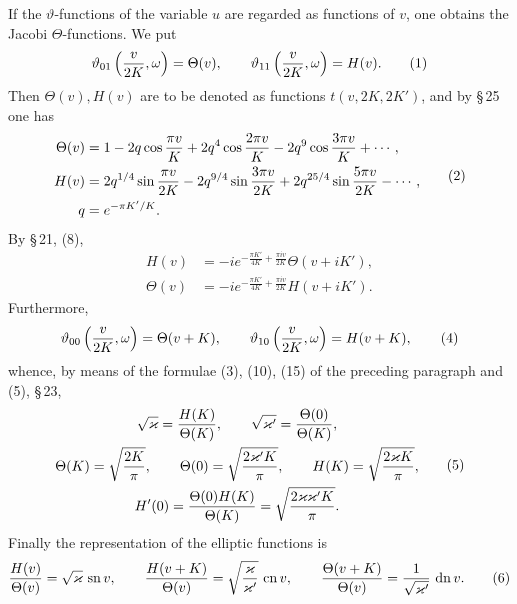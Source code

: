 \documentclass[11pt]{article}
\providecommand{\tht}{\vartheta}
\providecommand{\sn}{\operatorname{sn}}
\providecommand{\cn}{\operatorname{cn}}
\providecommand{\dn}{\operatorname{dn}}
\begin{document}
If the $\vartheta$-functions of the variable $u$ are regarded as functions of $v$, one obtains the Jacobi $\Theta$-functions. We put
\begin{equation}
\tht_{01}\left({v\over2K},\omega\right)=\Theta(v),
\qquad
\tht_{11}\left({v\over2K},\omega\right)=H(v).
\tag{1}
\end{equation}
Then $\Theta(v),H(v)$ are to be denoted as functions $t(v,2K,2K')$, and by \S\,25 one has
\begin{equation}
\begin{aligned}
\Theta(v)&=1-2q\cos{\pi v\over K}+2q^4\cos{2\pi v\over K}-2q^9\cos{3\pi v\over K}+\cdots,\\
H(v)&=2q^{1/4}\sin{\pi v\over2K}-2q^{9/4}\sin{3\pi v\over2K}+2q^{25/4}\sin{5\pi v\over2K}-\cdots,\\
q&=e^{-\pi K'/K}.
\end{aligned}
\tag{2}
\end{equation}
By \S\,21, (8),
\begin{equation}
\begin{aligned}
H(v)&=-i e^{-\frac{\pi K'}{4K}+\frac{\pi i v}{2K}}\Theta(v+iK'),\\
\Theta(v)&=-i e^{-\frac{\pi K'}{4K}+\frac{\pi i v}{2K}}H(v+iK').
\end{aligned}
\tag{3}
\end{equation}
Furthermore,
\begin{equation}
\tht_{00}\left({v\over2K},\omega\right)=\Theta(v+K),
\qquad
\tht_{10}\left({v\over2K},\omega\right)=H(v+K),
\tag{4}
\end{equation}
whence, by means of the formulae (3), (10), (15) of the preceding paragraph and (5), \S\,23,
\begin{equation}
\begin{gathered}
\sqrt\varkappa={H(K)\over\Theta(K)},
\qquad
\sqrt{\varkappa'}={\Theta(0)\over\Theta(K)},\\
\Theta(K)=\sqrt{2K\over\pi},
\qquad
\Theta(0)=\sqrt{2\varkappa'K\over\pi},
\qquad
H(K)=\sqrt{2\varkappa K\over\pi},\\
H'(0)={\Theta(0)H(K)\over\Theta(K)}=\sqrt{2\varkappa\varkappa'K\over\pi}.
\end{gathered}
\tag{5}
\end{equation}
Finally the representation of the elliptic functions is
\begin{equation}
{H(v)\over\Theta(v)}=\sqrt\varkappa\,\sn v,
\qquad
{H(v+K)\over\Theta(v)}=\sqrt{\varkappa\over\varkappa'}\,\cn v,
\qquad
{\Theta(v+K)\over\Theta(v)}={1\over\sqrt{\varkappa'}}\,\dn v.
\tag{6}
\end{equation}
\end{document}
